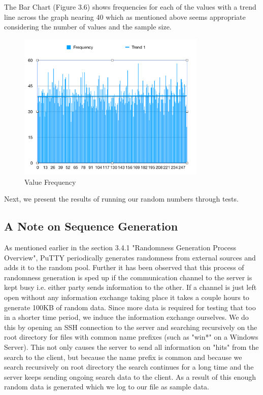 \documentclass{bhamthesis}
\begin{document}
The Bar Chart (Figure 3.6) shows frequencies for each of the values with a trend line across the graph nearing 40 which as mentioned above seems appropriate considering the number of values and the sample size.\par
\begin{figure}[ht]
\caption{Value Frequency}
\centering
\includegraphics[width=0.8\textwidth]{barchart.png}
\end{figure}
\clearpage
Next, we present the results of running our random numbers through tests. 
\subsection{A Note on Sequence Generation}
As mentioned earlier in the section 3.4.1 "Randomness Generation Process Overview", PuTTY periodically generates randomness from external sources and adds it to the random pool. Further it has been observed that this process of randomness generation is sped up if the communication channel to the server is kept busy i.e. either party sends information to the other. If a channel is just left open without any information exchange taking place it takes a couple hours to generate 100KB of random data. Since more data is required for testing that too in a shorter time period, we induce the information exchange ourselves. We do this by opening an SSH connection to the server and searching recursively on the root directory for files with common name prefixes (such as "win*" on a Windows Server). This not only causes the server to send all information on "hits" from the search to the client, but because the name prefix is common and because we search recursively on root directory the search continues for a long time and the server keeps sending ongoing search data to the client. As a result of this enough random data is generated which we log to our file as sample data.\par
\end{document}
